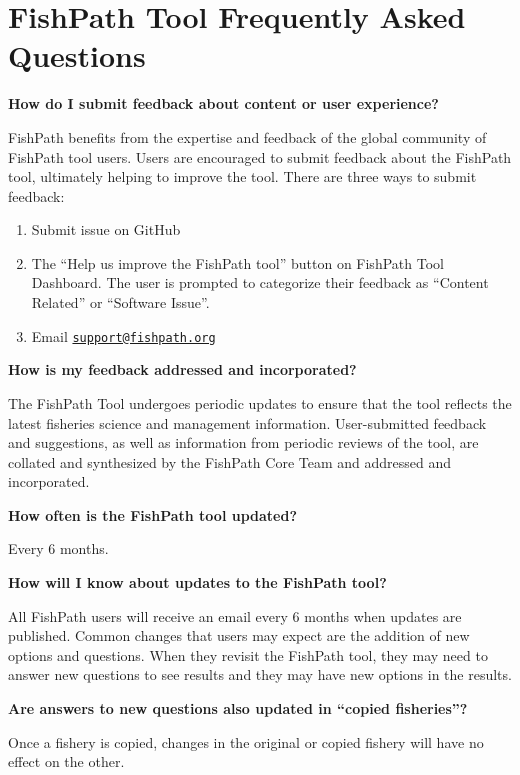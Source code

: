 \documentclass[11pt,]{book}
\providecommand{\tightlist}{%
  \setlength{\itemsep}{0pt}\setlength{\parskip}{0pt}}
\begin{document}
\hypertarget{fishpath-tool-frequently-asked-questions}{%
\chapter{FishPath Tool Frequently Asked
Questions}\label{fishpath-tool-frequently-asked-questions}}

\textbf{How do I submit feedback about content or user experience?}

FishPath benefits from the expertise and feedback of the global
community of FishPath tool users. Users are encouraged to submit
feedback about the FishPath tool, ultimately helping to improve the
tool. There are three ways to submit feedback:

\begin{enumerate}
\def\labelenumi{\arabic{enumi}.}
\tightlist
\item
  Submit issue on GitHub\\
\item
  The ``Help us improve the FishPath tool'' button on FishPath Tool
  Dashboard. The user is prompted to categorize their feedback as
  ``Content Related'' or ``Software Issue''.
\item
  Email
  \href{mailto:support@fishpath.org}{\nolinkurl{support@fishpath.org}}
\end{enumerate}

\textbf{How is my feedback addressed and incorporated?}

The FishPath Tool undergoes periodic updates to ensure that the tool
reflects the latest fisheries science and management information.
User-submitted feedback and suggestions, as well as information from
periodic reviews of the tool, are collated and synthesized by the
FishPath Core Team and addressed and incorporated.

\textbf{How often is the FishPath tool updated?}

Every 6 months.

\textbf{How will I know about updates to the FishPath tool?}

All FishPath users will receive an email every 6 months when updates are
published. Common changes that users may expect are the addition of new
options and questions. When they revisit the FishPath tool, they may
need to answer new questions to see results and they may have new
options in the results.

\textbf{Are answers to new questions also updated in ``copied
fisheries''?}

Once a fishery is copied, changes in the original or copied fishery will
have no effect on the other.
\end{document}
